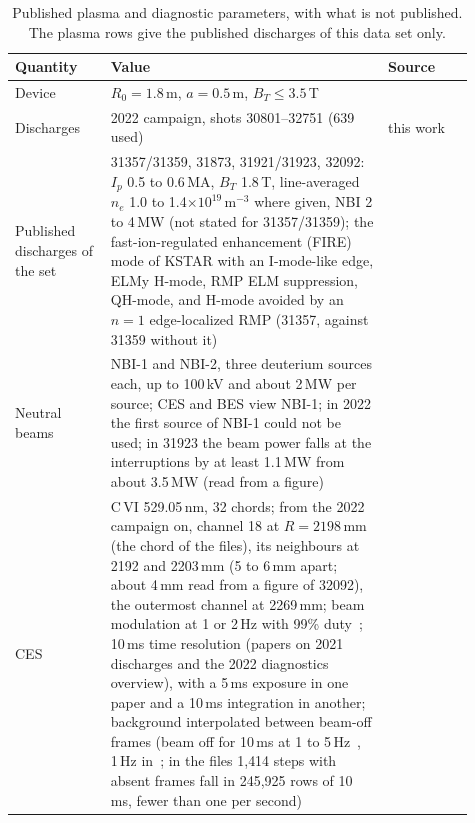 \begin{table}[p]
  \centering
  \caption{Published plasma and diagnostic parameters, with what is not published. The
  plasma rows give the published discharges of this data set only.}
  \label{tab:plasma}
  \scriptsize
  \begin{tabular}{p{0.19\linewidth}p{0.55\linewidth}p{0.17\linewidth}}
    \toprule
    Quantity & Value & Source \\
    \midrule
    Device & $R_0 = 1.8$\,m, $a = 0.5$\,m, $B_T \leq 3.5$\,T & \citep{Nam2026OverviewKstar} \\
    Discharges & 2022 campaign, shots 30801--32751 (639 used) & this work \\
    Published discharges of the set & 31357/31359, 31873, 31921/31923, 32092: $I_p$ 0.5 to 0.6\,MA, $B_T$ 1.8\,T, line-averaged $n_e$ 1.0 to 1.4$\times10^{19}$\,m$^{-3}$ where given, NBI 2 to 4\,MW (not stated for 31357/31359); the fast-ion-regulated enhancement (FIRE) mode of KSTAR with an I-mode-like edge, ELMy H-mode, RMP ELM suppression, QH-mode, and H-mode avoided by an $n = 1$ edge-localized RMP (31357, against 31359 without it) & \citep{Heo2025ExperimentalIdentification,Na2026FireMode,Kim2024HighestFusion,Yang2024TailoringTokamak,Lee2026SpatiotemporalStructure} \\
    Neutral beams & NBI-1 and NBI-2, three deuterium sources each, up to 100\,kV and about 2\,MW per source; CES and BES view NBI-1; in 2022 the first source of NBI-1 could not be used; in 31923 the beam power falls at the interruptions by at least 1.1\,MW from about 3.5\,MW (read from a figure) & \citep{Kwak2025EstimationNeutral,Lampert2015CombinedHydrogen,KFE2026DiagnosticsDataUserGuide,Lee2026NeuralNetworkbased,Han2024CriterionLong,Heo2025ExperimentalIdentification} \\
    CES & C\,VI 529.05\,nm, 32 chords; from the 2022 campaign on, channel 18 at $R = 2198$\,mm (the chord of the files), its neighbours at 2192 and 2203\,mm (5 to 6\,mm apart; about 4\,mm read from a figure of 32092), the outermost channel at 2269\,mm; beam modulation at 1 or 2\,Hz with 99\% duty~\citep{KFE2026DiagnosticsDataUserGuide}; 10\,ms time resolution (papers on 2021 discharges and the 2022 diagnostics overview), with a 5\,ms exposure in one paper and a 10\,ms integration in another; background interpolated between beam-off frames (beam off for 10\,ms at 1 to 5\,Hz~\citep{Lee2020TwoGaussian}, 1\,Hz in~\citep{Lee2026NeuralNetworkbased}; in the files 1{,}414 steps with absent frames fall in 245{,}925 rows of 10\,ms, fewer than one per second) & \citep{Lee2020TwoGaussian,Jang2021DevelopmentUltrafast,Lee2026NeuralNetworkbased,Kim2024KineticProfile,Lee2022OverviewRecent} \\

\end{tabular}
\end{table}
